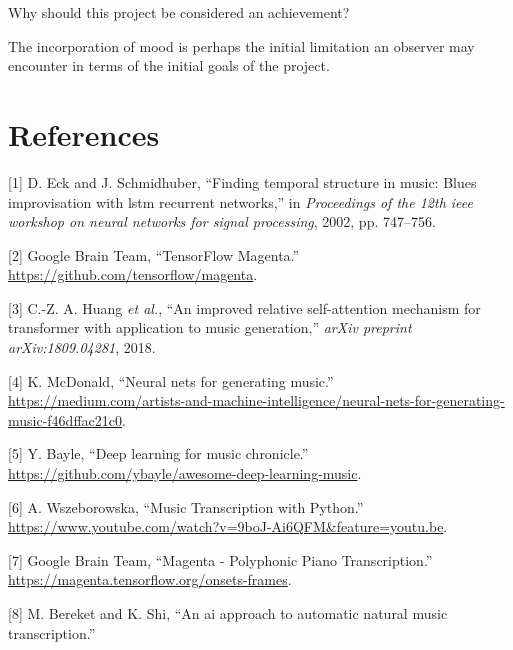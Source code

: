 \documentclass[12pt,]{article}
\begin{document}
Why should this project be considered an achievement?

The incorporation of mood is perhaps the initial limitation an observer
may encounter in terms of the initial goals of the project.

\hypertarget{references}{%
\section*{References}\label{references}}

\hypertarget{refs}{}
\leavevmode\hypertarget{ref-eck2002finding}{}%
{[}1{]} D. Eck and J. Schmidhuber, ``Finding temporal structure in
music: Blues improvisation with lstm recurrent networks,'' in
\emph{Proceedings of the 12th ieee workshop on neural networks for
signal processing}, 2002, pp. 747--756.

\leavevmode\hypertarget{ref-magenta}{}%
{[}2{]} \relax Google Brain Team, ``TensorFlow Magenta.'' \\
\url{https://github.com/tensorflow/magenta}.

\leavevmode\hypertarget{ref-huang2018improved}{}%
{[}3{]} C.-Z. A. Huang \emph{et al.}, ``An improved relative
self-attention mechanism for transformer with application to music
generation,'' \emph{arXiv preprint arXiv:1809.04281}, 2018.

\leavevmode\hypertarget{ref-mediumkylemcdonald}{}%
{[}4{]} K. McDonald, ``Neural nets for generating music.'' \\
\url{https://medium.com/artists-and-machine-intelligence/neural-nets-for-generating-music-f46dffac21c0}.

\leavevmode\hypertarget{ref-libdlmusic}{}%
{[}5{]} Y. Bayle, ``Deep learning for music chronicle.'' \\
\url{https://github.com/ybayle/awesome-deep-learning-music}.

\leavevmode\hypertarget{ref-annaw}{}%
{[}6{]} A. Wszeborowska, ``Music Transcription with Python.'' \\
\url{https://www.youtube.com/watch?v=9boJ-Ai6QFM\&feature=youtu.be}.

\leavevmode\hypertarget{ref-magentaonsetframes}{}%
{[}7{]} \relax Google Brain Team, ``Magenta - Polyphonic Piano
Transcription.'' \\
\url{https://magenta.tensorflow.org/onsets-frames}.

\leavevmode\hypertarget{ref-bereketai}{}%
{[}8{]} M. Bereket and K. Shi, ``An ai approach to automatic natural
music transcription.''
\end{document}
